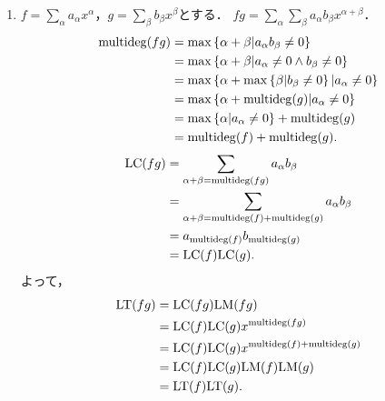 \documentclass[9pt]{ltjsarticle}
\begin{document}
\begin{enumerate}[label=(問題\arabic*)]
\begin{enumerate}[label=(\alph*)]
 \item
$f=\sum_\alpha a_\alpha x^\alpha$，$g=\sum_\beta b_\beta x^\beta$とする．
 $fg=\sum_\alpha \sum_\beta a_\alpha b_\beta x^{\alpha +\beta}$．
\begin{align}
 \mathrm{multideg}(fg)
&=
\max\left\{\alpha + \beta  | a_\alpha b_\beta \neq 0\right\}\\
 & =
\max\left\{\alpha + \beta  | a_\alpha \neq 0 \land b_\beta \neq 0\right\}\\
 & =
\max\left\{\alpha + \max\left\{\beta | b_\beta \neq 0\right\} | a_\alpha \neq 0\right\}\\
 & =
\max\left\{\alpha + \mathrm{multideg}(g) | a_\alpha \neq 0\right\}\\
 & =
\max\left\{\alpha | a_\alpha \neq 0\right\}+ \mathrm{multideg}(g) \\
 & =
\mathrm{multideg}(f) + \mathrm{multideg}(g).
\end{align}
\begin{align}
 {\rm LC}(fg)
&=
\sum_{\alpha + \beta = \mathrm{multideg}(fg)} a_{\alpha}b_\beta\\
 & =
\sum_{\alpha + \beta = \mathrm{multideg}(f)+\mathrm{multideg}(g)} a_{\alpha}b_\beta\\
 & =
a_{\mathrm{multideg}(f)} b_{\mathrm{multideg}(g)}\\
 & =
{\rm LC}(f) {\rm LC}(g).
\end{align}
よって，
\begin{align}
 {\rm LT}(fg)
&=
{\rm LC}(fg){\rm LM}(fg)\\
 & =
{\rm LC}(f){\rm LC}(g) x^{\mathrm{multideg}(fg)}\\
 & =
{\rm LC}(f){\rm LC}(g) x^{\mathrm{multideg}(f)+\mathrm{multideg}(g)}\\
 & =
{\rm LC}(f){\rm LC}(g){\rm LM}(f){\rm LM}(g)\\
 & =
{\rm LT}(f){\rm LT}(g).
\end{align}


\end{enumerate}
\end{enumerate}
\end{document}
